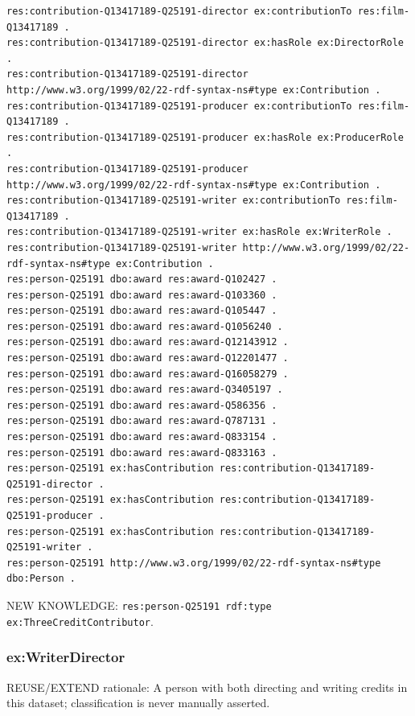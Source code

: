\documentclass[
  11pt,
]{article}
\begin{document}
\begin{verbatim}
res:contribution-Q13417189-Q25191-director ex:contributionTo res:film-Q13417189 .
res:contribution-Q13417189-Q25191-director ex:hasRole ex:DirectorRole .
res:contribution-Q13417189-Q25191-director http://www.w3.org/1999/02/22-rdf-syntax-ns#type ex:Contribution .
res:contribution-Q13417189-Q25191-producer ex:contributionTo res:film-Q13417189 .
res:contribution-Q13417189-Q25191-producer ex:hasRole ex:ProducerRole .
res:contribution-Q13417189-Q25191-producer http://www.w3.org/1999/02/22-rdf-syntax-ns#type ex:Contribution .
res:contribution-Q13417189-Q25191-writer ex:contributionTo res:film-Q13417189 .
res:contribution-Q13417189-Q25191-writer ex:hasRole ex:WriterRole .
res:contribution-Q13417189-Q25191-writer http://www.w3.org/1999/02/22-rdf-syntax-ns#type ex:Contribution .
res:person-Q25191 dbo:award res:award-Q102427 .
res:person-Q25191 dbo:award res:award-Q103360 .
res:person-Q25191 dbo:award res:award-Q105447 .
res:person-Q25191 dbo:award res:award-Q1056240 .
res:person-Q25191 dbo:award res:award-Q12143912 .
res:person-Q25191 dbo:award res:award-Q12201477 .
res:person-Q25191 dbo:award res:award-Q16058279 .
res:person-Q25191 dbo:award res:award-Q3405197 .
res:person-Q25191 dbo:award res:award-Q586356 .
res:person-Q25191 dbo:award res:award-Q787131 .
res:person-Q25191 dbo:award res:award-Q833154 .
res:person-Q25191 dbo:award res:award-Q833163 .
res:person-Q25191 ex:hasContribution res:contribution-Q13417189-Q25191-director .
res:person-Q25191 ex:hasContribution res:contribution-Q13417189-Q25191-producer .
res:person-Q25191 ex:hasContribution res:contribution-Q13417189-Q25191-writer .
res:person-Q25191 http://www.w3.org/1999/02/22-rdf-syntax-ns#type dbo:Person .
\end{verbatim}

NEW KNOWLEDGE:
\texttt{res:\allowbreak{}pers\allowbreak{}on-\allowbreak{}\allowbreak{}Q2519\allowbreak{}1 rdf:\allowbreak{}ty\allowbreak{}pe ex:\allowbreak{}\allowbreak{}Th\allowbreak{}ree\allowbreak{}Credi\allowbreak{}t\allowbreak{}Contrib\allowbreak{}utor}.

\subsubsection{\texorpdfstring{ex:\allowbreak{}\allowbreak{}Write\allowbreak{}r\allowbreak{}Directo\allowbreak{}r}{}}\label{exwriterdirector}

REUSE/EXTEND rationale: A person with both directing and writing credits
in this dataset; classifi\allowbreak{}cation is never manually asserted.
\end{document}
